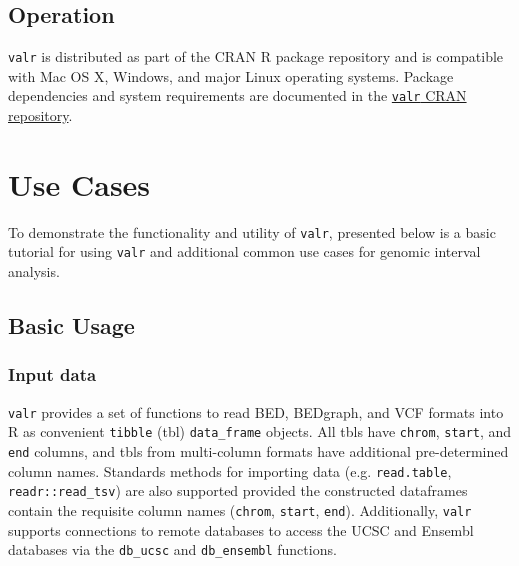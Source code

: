 \documentclass[9pt,a4paper]{extarticle}
\begin{document}
\subsection*{Operation}
\texttt{valr} is distributed as part of the CRAN R package repository and is compatible with Mac OS X, Windows, and major Linux operating systems. Package dependencies and system requirements are documented in the \href{https://cran.r-project.org/web/packages/valr/index.html}{\texttt{valr} CRAN repository}.

\section*{Use Cases}
To demonstrate the functionality and utility of \texttt{valr}, presented below is a basic tutorial for using \texttt{valr} and additional common use cases for genomic interval analysis.

\subsection*{Basic Usage}

\subsubsection*{Input data}\label{input-data}

\texttt{valr} provides a set of functions to read BED, BEDgraph, and VCF formats into R as convenient \texttt{tibble} (tbl) \texttt{data\_frame} objects. All tbls have \texttt{chrom}, \texttt{start}, and \texttt{end} columns, and tbls from multi-column formats have additional pre-determined column names. Standards methods for importing data (e.g. \texttt{read.table}, \texttt{readr::read\_tsv}) are also supported provided the constructed dataframes contain the requisite column names (\texttt{chrom}, \texttt{start}, \texttt{end}). Additionally, \texttt{valr} supports connections to remote databases to access the UCSC and Ensembl databases via the \texttt{db\_ucsc} and \texttt{db\_ensembl} functions.
\end{document}
